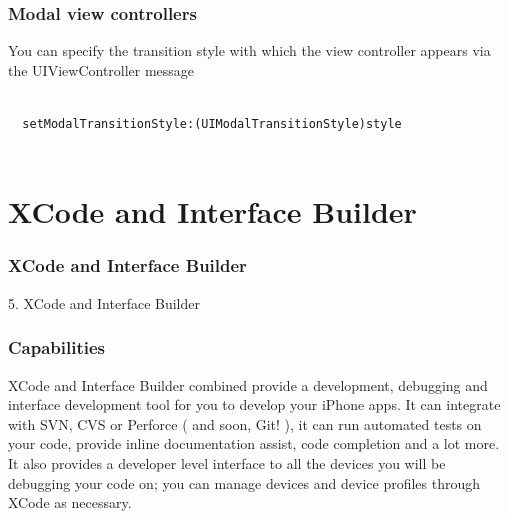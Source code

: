 \documentclass[10pt]{beamer}
\begin{document}
\begin{frame}[fragile]
  \frametitle{Modal view controllers}
  You can specify the transition style with which the view controller appears via the UIViewController message \begin{verbatim}
  
  setModalTransitionStyle:(UIModalTransitionStyle)style
            
  \end{verbatim} 

\end{frame}

    

   
  

  
    
\section{XCode and Interface Builder}
\begin{frame}[fragile]
  \frametitle{XCode and Interface Builder}
  5. XCode and Interface Builder
\end{frame}


    
\begin{frame}[fragile]
  \frametitle{Capabilities}
  XCode and Interface Builder combined provide a development, debugging and interface development tool for you to develop your iPhone apps.  It can integrate with SVN, CVS or Perforce ( and soon, Git! ), it can run automated tests on your code, provide inline documentation assist, code completion and a lot more. It also provides a developer level interface to all the devices you will be debugging your code on; you can manage devices and device profiles through XCode as necessary.

\end{frame}
\end{document}
